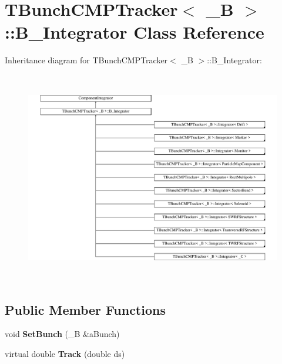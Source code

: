 \hypertarget{classTBunchCMPTracker_1_1B__Integrator}{}\section{T\+Bunch\+C\+M\+P\+Tracker$<$ \+\_\+B $>$\+:\+:B\+\_\+\+Integrator Class Reference}
\label{classTBunchCMPTracker_1_1B__Integrator}
Inheritance diagram for T\+Bunch\+C\+M\+P\+Tracker$<$ \+\_\+B $>$\+:\+:B\+\_\+\+Integrator\+:\begin{figure}[H]
\begin{center}
\leavevmode
\includegraphics[height=9.333334cm]{classTBunchCMPTracker_1_1B__Integrator}
\end{center}
\end{figure}
\subsection*{Public Member Functions}
\begin{DoxyCompactItemize}
\item 
\mbox{\label{classTBunchCMPTracker_1_1B__Integrator_ad7015d6e3d90070283aac44ac1e9555b}} 
void {\bfseries Set\+Bunch} (\+\_\+B \&a\+Bunch)
\item 
\mbox{\label{classTBunchCMPTracker_1_1B__Integrator_a5bfcc6e762a41c0660d6884d980b72b4}} 
virtual double {\bfseries Track} (double ds)
\end{DoxyCompactItemize}
